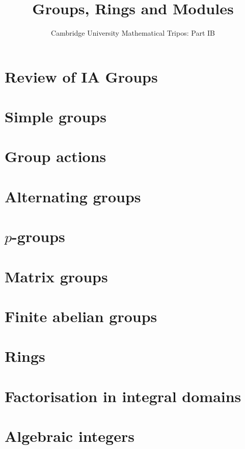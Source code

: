 \documentclass{article}
\title{Groups, Rings and Modules}
\author{Cambridge University Mathematical Tripos: Part IB}
\begin{document}
\maketitle

\tableofcontentsnewpage{}

\section{Review of IA Groups}

\section{Simple groups}

\section{Group actions}

\section{Alternating groups}

\section{\( p \)-groups}

\section{Matrix groups}

\section{Finite abelian groups}

\section{Rings}

\section{Factorisation in integral domains}

\section{Algebraic integers}

\end{document}
